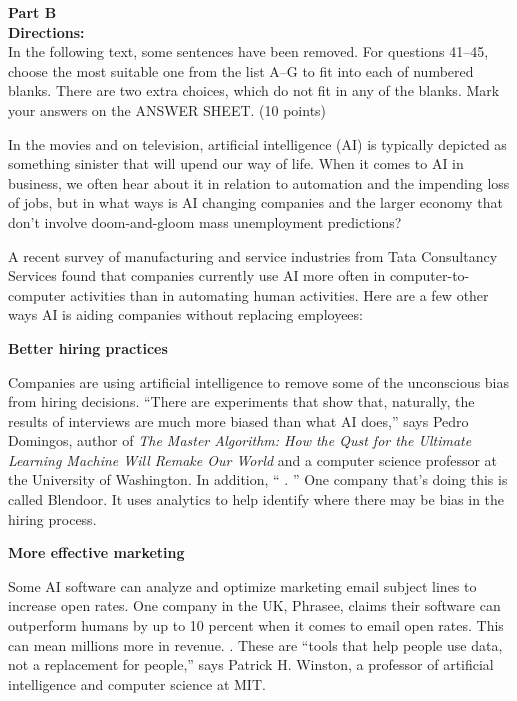 \newpage

\noindent
\textbf{Part B}\\
\textbf{Directions:}\\
In the following text, some sentences have been removed. For
questions 41--45, choose the most suitable one from the list A--G to fit
into each of numbered blanks. There are two extra choices, which do not
fit in any of the blanks. Mark your answers on the ANSWER SHEET. (10
points)


\TiGanSpace

In the movies and on television, artificial intelligence (AI) is
typically depicted as something sinister that will upend our way of
life. When it comes to AI in business, we often hear about it in
relation to automation and the impending loss of jobs, but in what ways
is AI changing companies and the larger economy that don't involve
doom-and-gloom mass unemployment predictions?

A recent survey of manufacturing and service industries from Tata
Consultancy Services found that companies currently use AI more often in
computer-to-computer activities than in automating human activities. 
Here are a few other ways AI is aiding companies without replacing
employees:



\textbf{Better hiring practices}


Companies are using artificial intelligence to remove some of the
unconscious bias from hiring decisions. ``There are experiments that
show that, naturally, the results of interviews are
much more biased than what AI does,'' 
says Pedro Domingos, author of \emph{The Master Algorithm: How the
	Qust for the Ultimate Learning Machine Will Remake Our World} and a
computer science professor at the University of Washington. In addition,
``  \linefill. '' One company that's doing this
is called Blendoor. It uses analytics to help identify where there may be bias
in the hiring process.



\textbf{More effective marketing}


Some AI software can analyze and optimize marketing email subject lines
to increase open rates. One company in the UK, Phrasee, claims their
software can outperform humans by up to 10 percent when it comes to
email open rates. This can mean millions more in revenue. 
\linefill.
These are ``tools that help people use data, not a replacement for
people,'' says Patrick
H. Winston, a professor of artificial
intelligence and computer science at MIT.



